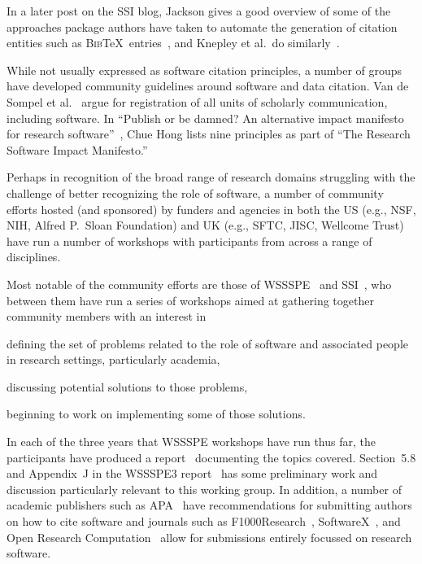 \documentclass[11pt, oneside]{amsart}
\newcommand{\katznote}[1]{ {\textcolor{blue} { ***DSK: #1 }}} %
\newcommand{\asnote}[1]{ {\textcolor{red} { ***AMS: #1 }}} %
\begin{document}
In a later post on the SSI blog, Jackson gives a good overview of some of the
approaches package authors have taken to automate the generation of citation
entities such as \textsc{Bib}\TeX\ entries~\cite{ssi-how-shalt-i-cite-thee}, and
Knepley et al.\ do similarly~\cite{knepley2013accurately}.

While not usually expressed as software citation principles, a number of groups
have developed community guidelines around software and data citation. Van de
Sompel et al.~\cite{VandeSompel2004} argue for registration of all units of
scholarly communication, including software. In ``Publish or be damned? An
alternative impact manifesto for research
software''~\cite{ssi-publish-or-be-damned}, Chue Hong lists nine principles as
part of ``The Research Software Impact Manifesto.''

Perhaps in recognition of the broad range of research domains struggling with
the challenge of better recognizing the role of software, a number of community
efforts hosted (and sponsored) by funders and agencies in both the US (e.g.,
NSF, NIH, Alfred P.\ Sloan Foundation) and UK (e.g., SFTC, JISC, Wellcome Trust)
have run a number of workshops with participants from across a range of
disciplines.

Most notable of the community efforts are those of WSSSPE~\cite{wssspe} and
SSI~\cite{ssi-workshops}, who between them have run a series of workshops aimed
at gathering together community members with an interest in
\begin{enumerate*}[series=InlineList, before=\hspace{-0.6ex}]
    \item defining the set
of problems related to the role of software and associated people in research
settings, particularly academia,
    \item discussing potential solutions to those
problems, 
\item beginning to work on implementing some of those solutions.
  \end{enumerate*}
In each of the three years that WSSSPE workshops have run thus far, the
participants have produced a report~\cite{WSSSPE1,WSSSPE2,WSSSPE3} documenting
the topics covered. Section~5.8 and Appendix~J in the WSSSPE3
report~\cite{WSSSPE3} has some preliminary work and discussion particularly
relevant to this working group.  In addition, a number of academic publishers
such as APA~\cite{APA-guidelines} have recommendations for submitting authors on
how to cite software and journals such as F1000Research~\cite{F1000},
SoftwareX~\cite{softwareX}, and Open Research Computation~\cite{softwareX} allow
for submissions entirely focussed on research software.
\end{document}
